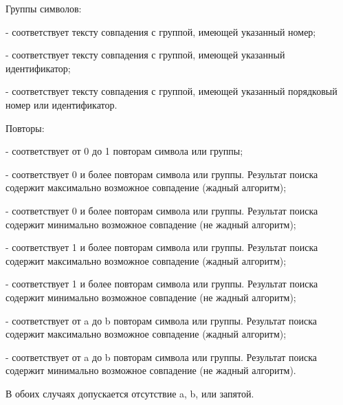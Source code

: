 \begin{keylist}{Группы символов:}
  
   - соответствует тексту совпадения с группой, имеющей указанный номер;
  
   - соответствует тексту совпадения с группой, имеющей указанный идентификатор;
  
   - соответствует тексту совпадения с группой, имеющей указанный порядковый номер или идентификатор.
\end{keylist}

\begin{keylist}{Повторы:}
  
   - соответствует от 0 до 1 повторам символа или группы;
  
   - соответствует 0 и более повторам символа или группы. Результат поиска содержит максимально возможное совпадение (жадный алгоритм);
  
   - соответствует 0 и более повторам символа или группы. Результат поиска содержит минимально возможное совпадение (не жадный алгоритм);
  
   - соответствует 1 и более повторам символа или группы. Результат поиска содержит максимально возможное совпадение (жадный алгоритм);
  
   - соответствует 1 и более повторам символа или группы. Результат поиска содержит минимально возможное совпадение (не жадный алгоритм);
  
   - соответствует от a до b повторам символа или группы. Результат поиска содержит максимально возможное совпадение (жадный алгоритм);
  
   - соответствует от a до b повторам символа или группы. Результат поиска содержит минимально возможное совпадение (не жадный алгоритм).
  
  В обоих случаях допускается отсутствие a, b, или запятой.
\end{keylist}

